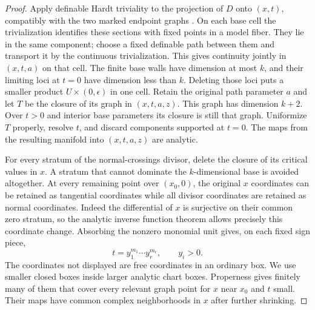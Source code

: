 \begin{proof}
Apply definable Hardt triviality to the projection of $D$ onto $(x,t)$,
compatibly with the two marked endpoint graphs
\cite[Theorem~5.22]{Coste1999}. On each base cell
the trivialization identifies these sections with fixed points in a
model fiber.  They lie in the same component; choose a fixed definable
path between them and transport it by the continuous trivialization.
This gives continuity jointly in $(x,t,a)$ on that cell.  The finite
base walls have dimension at most $k$, and their limiting loci at
$t=0$ have dimension less than $k$.  Deleting those loci puts a smaller
product $U\times(0,\epsilon)$ in one cell.  Retain the original
path parameter $a$ and let $T$ be the closure of its graph in
$(x,t,a,z)$.  This graph has dimension $k+2$.  Over $t>0$ and interior
base parameters its closure is still that graph.  Uniformize $T$
properly, resolve $t$, and discard components supported at $t=0$.
The maps from the resulting manifold into $(x,t,a,z)$ are analytic.

For every stratum of the normal-crossings divisor, delete the closure
of its critical values in $x$.  A stratum that cannot dominate the
$k$-dimensional base is avoided altogether.  At every remaining point
over $(x_0,0)$, the original $x$ coordinates can be retained as
tangential coordinates while all divisor coordinates are retained as
normal coordinates.  Indeed the differential of $x$ is surjective
on their common zero stratum, so the analytic inverse function theorem
allows precisely this coordinate change.  Absorbing the nonzero
monomial unit gives, on each fixed sign piece,
\begin{equation}\label{loc:monomial}
                t=y_1^{m_1}\cdots y_r^{m_r},\qquad y_i>0.
\end{equation}
The coordinates not displayed are free coordinates in an ordinary
box.  We use smaller closed boxes inside larger analytic chart boxes.
Properness gives finitely many of them that cover every relevant
graph point for $x$ near $x_0$ and $t$ small.  Their maps have common
complex neighborhoods in $x$ after further shrinking.


\end{proof}
